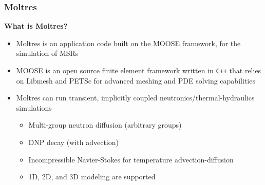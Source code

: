 \begin{frame}
	\frametitle{Moltres}
		\textbf{What is Moltres?}
		\begin{itemize}
			\item Moltres is an application code built on the \gls{MOOSE}
			framework, for the simulation of \glspl{MSR}
			\item \gls{MOOSE} is an open source finite element framework written
			in \texttt{C++} that
			relies on Libmesh and PETSc for advanced meshing and PDE solving
			capabilities
			\item Moltres can run transient, implicitly coupled
			neutronics/thermal-hydraulics simulations
			\begin{itemize}
				\item Multi-group neutron diffusion (arbitrary groups)
				\item \gls{DNP} decay (with advection)
				\item Incompressible Navier-Stokes for temperature
				advection-diffusion
				\item 1D, 2D, and 3D modeling are supported
			\end{itemize}
		\end{itemize}
\end{frame}